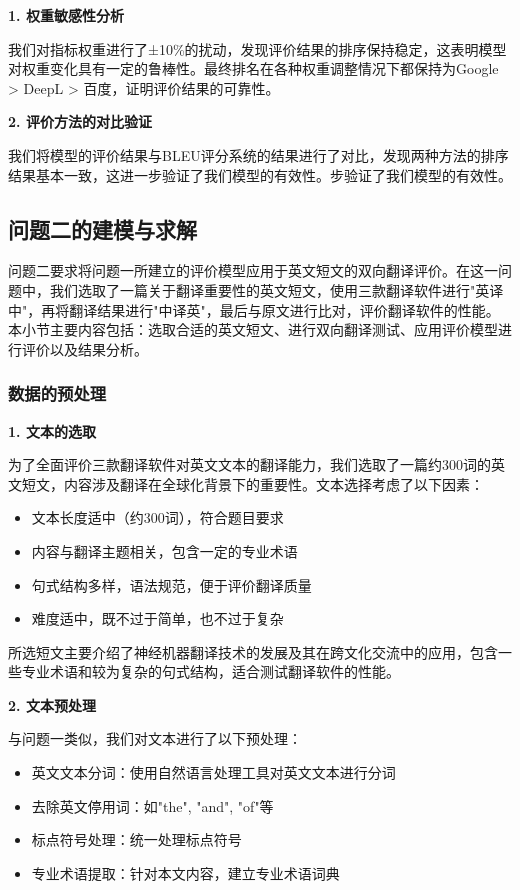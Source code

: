 \documentclass[bwprint]{cumcmthesis}
\begin{document}
\textbf{1. 权重敏感性分析}

我们对指标权重进行了±10\%的扰动，发现评价结果的排序保持稳定，这表明模型对权重变化具有一定的鲁棒性。最终排名在各种权重调整情况下都保持为Google > DeepL > 百度，证明评价结果的可靠性。

\textbf{2. 评价方法的对比验证}

我们将模型的评价结果与BLEU评分系统的结果进行了对比，发现两种方法的排序结果基本一致，这进一步验证了我们模型的有效性。步验证了我们模型的有效性。

\subsection{问题二的建模与求解}
问题二要求将问题一所建立的评价模型应用于英文短文的双向翻译评价。在这一问题中，我们选取了一篇关于翻译重要性的英文短文，使用三款翻译软件进行"英译中"，再将翻译结果进行"中译英"，最后与原文进行比对，评价翻译软件的性能。本小节主要内容包括：选取合适的英文短文、进行双向翻译测试、应用评价模型进行评价以及结果分析。

\subsubsection{数据的预处理}
\textbf{1. 文本的选取}
    
为了全面评价三款翻译软件对英文文本的翻译能力，我们选取了一篇约300词的英文短文，内容涉及翻译在全球化背景下的重要性。文本选择考虑了以下因素：
\begin{itemize}
    \item 文本长度适中（约300词），符合题目要求
    \item 内容与翻译主题相关，包含一定的专业术语
    \item 句式结构多样，语法规范，便于评价翻译质量
    \item 难度适中，既不过于简单，也不过于复杂
\end{itemize}

所选短文主要介绍了神经机器翻译技术的发展及其在跨文化交流中的应用，包含一些专业术语和较为复杂的句式结构，适合测试翻译软件的性能。
    
\textbf{2. 文本预处理}
    
与问题一类似，我们对文本进行了以下预处理：
\begin{itemize}
    \item 英文文本分词：使用自然语言处理工具对英文文本进行分词
    \item 去除英文停用词：如"the", "and", "of"等
    \item 标点符号处理：统一处理标点符号
    \item 专业术语提取：针对本文内容，建立专业术语词典
\end{itemize}
\end{document}
